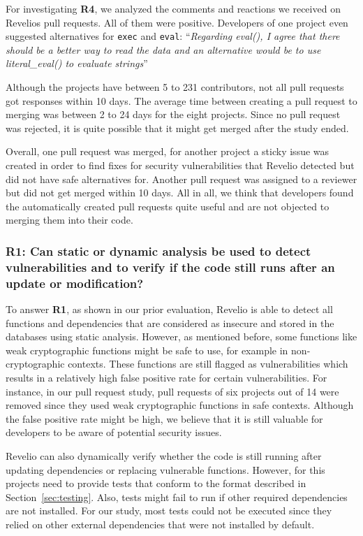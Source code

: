 For investigating \textbf{R4}, we analyzed the comments and reactions we received on Revelios pull requests. All of them were positive. Developers of one project even suggested alternatives for \texttt{exec} and \texttt{eval}:
\enquote{\textit{Regarding eval(), I agree that there should be a better way to read the data and an alternative would be to use literal\_eval() to evaluate strings}}

Although the projects have between 5 to 231 contributors, not all pull requests got responses within 10 days. The average time between creating a pull request to merging was between 2 to 24 days for the eight projects. Since no pull request was rejected, it is quite possible that it might get merged after the study ended.

Overall, one pull request was merged, for another project a sticky issue was created in order to find fixes for security vulnerabilities that Revelio detected but did not have safe alternatives for. Another pull request was assigned to a reviewer but did not get merged within 10 days. All in all, we think that developers found the automatically created pull requests quite useful and are not objected to merging them into their code.


\subsubsection{R1: Can static or dynamic analysis be used to detect vulnerabilities and to verify if the code still runs after an update or modification?}

To answer \textbf{R1}, as shown in our prior evaluation, Revelio is able to detect all functions and dependencies that are considered as insecure and stored in the databases using static analysis. However, as mentioned before, some functions like weak cryptographic functions might be safe to use, for example in non-cryptographic contexts. These functions are still flagged as vulnerabilities which results in a relatively high false positive rate for certain vulnerabilities. For instance, in our pull request study, pull requests of six projects out of 14 were removed since they used weak cryptographic functions in safe contexts. Although the false positive rate might be high, we believe that it is still valuable for developers to be aware of potential security issues. 

Revelio can also dynamically verify whether the code is still running after updating dependencies or replacing vulnerable functions. However, for this projects need to provide tests that conform to the format described in Section~\ref{sec:testing}. Also, tests might fail to run if other required dependencies are not installed. For our study, most tests could not be executed since they relied on other external dependencies that were not installed by default.



